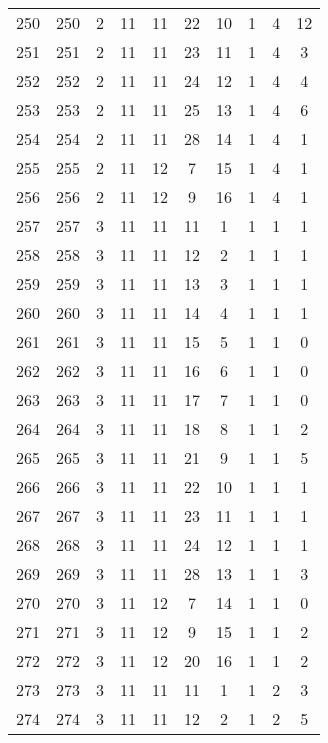 \begin{longtable}{cccccccccc}
  250 & 250 &   2 &  11 &  11 &  22 &  10 &   1 &   4 &  12 \\ 
  251 & 251 &   2 &  11 &  11 &  23 &  11 &   1 &   4 &   3 \\ 
  252 & 252 &   2 &  11 &  11 &  24 &  12 &   1 &   4 &   4 \\ 
  253 & 253 &   2 &  11 &  11 &  25 &  13 &   1 &   4 &   6 \\ 
  254 & 254 &   2 &  11 &  11 &  28 &  14 &   1 &   4 &   1 \\ 
  255 & 255 &   2 &  11 &  12 &   7 &  15 &   1 &   4 &   1 \\ 
  256 & 256 &   2 &  11 &  12 &   9 &  16 &   1 &   4 &   1 \\ 
  257 & 257 &   3 &  11 &  11 &  11 &   1 &   1 &   1 &   1 \\ 
  258 & 258 &   3 &  11 &  11 &  12 &   2 &   1 &   1 &   1 \\ 
  259 & 259 &   3 &  11 &  11 &  13 &   3 &   1 &   1 &   1 \\ 
  260 & 260 &   3 &  11 &  11 &  14 &   4 &   1 &   1 &   1 \\ 
  261 & 261 &   3 &  11 &  11 &  15 &   5 &   1 &   1 &   0 \\ 
  262 & 262 &   3 &  11 &  11 &  16 &   6 &   1 &   1 &   0 \\ 
  263 & 263 &   3 &  11 &  11 &  17 &   7 &   1 &   1 &   0 \\ 
  264 & 264 &   3 &  11 &  11 &  18 &   8 &   1 &   1 &   2 \\ 
  265 & 265 &   3 &  11 &  11 &  21 &   9 &   1 &   1 &   5 \\ 
  266 & 266 &   3 &  11 &  11 &  22 &  10 &   1 &   1 &   1 \\ 
  267 & 267 &   3 &  11 &  11 &  23 &  11 &   1 &   1 &   1 \\ 
  268 & 268 &   3 &  11 &  11 &  24 &  12 &   1 &   1 &   1 \\ 
  269 & 269 &   3 &  11 &  11 &  28 &  13 &   1 &   1 &   3 \\ 
  270 & 270 &   3 &  11 &  12 &   7 &  14 &   1 &   1 &   0 \\ 
  271 & 271 &   3 &  11 &  12 &   9 &  15 &   1 &   1 &   2 \\ 
  272 & 272 &   3 &  11 &  12 &  20 &  16 &   1 &   1 &   2 \\ 
  273 & 273 &   3 &  11 &  11 &  11 &   1 &   1 &   2 &   3 \\ 
  274 & 274 &   3 &  11 &  11 &  12 &   2 &   1 &   2 &   5 \\ 

\end{longtable}
